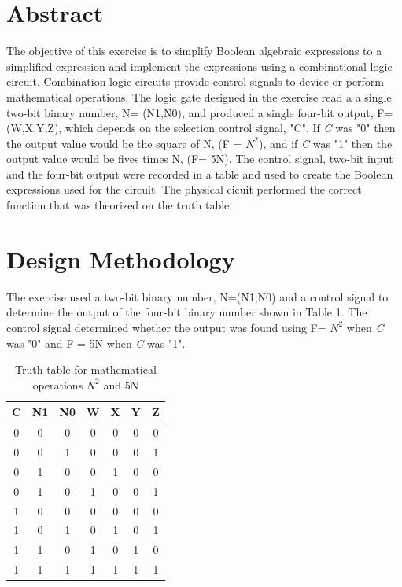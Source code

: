 \documentclass[CMPE]{KGCOEReport}
\begin{document}
\maketitle

\section*{Abstract}
The objective of this exercise is to simplify Boolean algebraic expressions to a simplified expression and implement the expressions using a combinational logic circuit. Combination logic circuits provide control signals to device or perform mathematical operations. The logic gate designed in the exercise read a a single two-bit binary number, N= (N1,N0), and produced a single four-bit output, F=(W,X,Y,Z), which depends on the selection control signal, "C". If \textit{C} was "0" then the output value would be the square of N,  (F = $N^2$), and if \textit{C} was "1" then the output value would be fives times N, (F= 5N). The control signal, two-bit input and the four-bit output were recorded in a table and used to create the Boolean expressions used for the circuit. The physical cicuit performed the correct function that was theorized on the truth table.
\section*{Design Methodology}
The exercise used a two-bit binary number, N=(N1,N0) and a control signal to determine the output of the four-bit binary number shown in Table 1. The control signal determined whether the output was found using F= $N^2$ when \textit{C} was "0" and F = 5N when \textit{C} was "1".
\begin{table}[H]
	\centering
	\caption{Truth table for mathematical operations $N^2$ and 5N}
	\label{tab: Table 1}
	\begin{tabular}{|ccc||cccc|}
		\hline
		C & N1 & N0 & W & X & Y & Z\\ \hline
		0 & 0 & 0 & 0 & 0 & 0 & 0\\ \hline
		0 & 0 & 1 & 0 & 0 & 0 & 1\\ \hline
		0 & 1 & 0 & 0 & 1 & 0 & 0\\ \hline
		0 & 1 & 0 & 1 & 0 & 0 & 1\\ \hline
		1 & 0 & 0 & 0 & 0 & 0 & 0\\ \hline
		1 & 0 & 1 & 0 & 1 & 0 & 1\\ \hline
		1 & 1 & 0 & 1 & 0 & 1 & 0\\ \hline
		1 & 1 & 1 & 1 & 1 & 1 & 1\\
		\hline
	\end{tabular}
\end{table}
\end{document}
